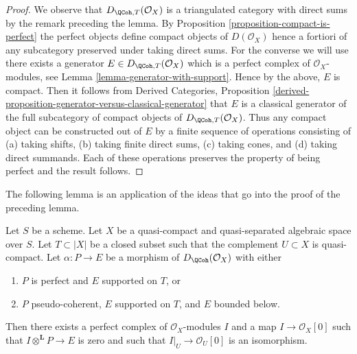 \begin{proof}
We observe that $D_{\QCoh, T}(\mathcal{O}_X)$ is a triangulated
category with direct sums by the remark preceding the lemma.
By Proposition \ref{proposition-compact-is-perfect}
the perfect objects define compact objects of $D(\mathcal{O}_X)$
hence a fortiori of any subcategory preserved under taking direct
sums. For the converse we will use there exists a generator
$E \in D_{\QCoh, T}(\mathcal{O}_X)$ which is a perfect complex
of $\mathcal{O}_X$-modules, see
Lemma \ref{lemma-generator-with-support}.
Hence by the above, $E$ is compact. Then it follows from
Derived Categories, Proposition
\ref{derived-proposition-generator-versus-classical-generator}
that $E$ is a classical generator of the full subcategory
of compact objects of $D_{\QCoh, T}(\mathcal{O}_X)$.
Thus any compact object can be constructed out of $E$ by
a finite sequence of operations consisting of
(a) taking shifts, (b) taking finite direct sums, (c) taking cones, and
(d) taking direct summands. Each of these operations preserves
the property of being perfect and the result follows.
\end{proof}

\noindent
The following lemma is an application of the ideas that go into
the proof of the preceding lemma.

\begin{lemma}
\label{lemma-map-from-pseudo-coherent-to-complex-with-support}
Let $S$ be a scheme. Let $X$ be a quasi-compact and quasi-separated
algebraic space over $S$. Let $T \subset |X|$
be a closed subset such that the complement $U \subset X$ is quasi-compact.
Let $\alpha : P \to E$ be a morphism of $D_\QCoh(\mathcal{O}_X)$ with
either
\begin{enumerate}
\item $P$ is perfect and $E$ supported on $T$, or
\item $P$ pseudo-coherent, $E$ supported on $T$, and $E$ bounded below.
\end{enumerate}
Then there exists a perfect complex of $\mathcal{O}_X$-modules $I$
and a map $I \to \mathcal{O}_X[0]$ such that
$I \otimes^\mathbf{L} P \to E$ is zero and such that
$I|_U \to \mathcal{O}_U[0]$ is an
isomorphism.
\end{lemma}

